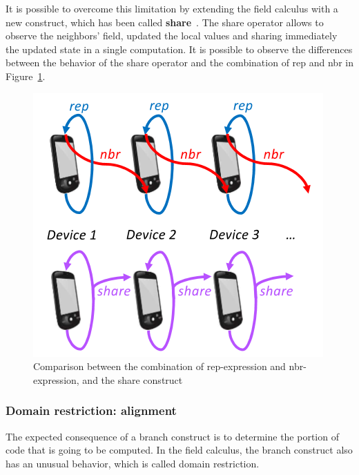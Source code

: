It is possible to overcome this limitation by extending the field calculus with a new construct, which has been called \textbf{share}~\cite{share_operator}. The share operator allows to observe the neighbors' field, updated the local values and sharing immediately the updated state in a single computation. It is possible to observe the differences between the behavior of the share operator and the combination of rep and nbr in Figure~\ref{fig:share_operator_introduction}.

\begin{figure}[!ht]
    \centering
    \includegraphics[scale=0.8]{document/chapters/1-introduction/images/share_operator_introduction.png}
    \caption{Comparison between the combination of rep-expression and nbr-expression, and the share construct~\cite{share_operator}}
    \label{fig:share_operator_introduction}
\end{figure}

\subsubsection{Domain restriction: alignment}\label{subsection:alignment}
The expected consequence of a branch construct is to determine the portion of code that is going to be computed. In the field calculus, the branch construct also has an unusual behavior, which is called domain restriction.

